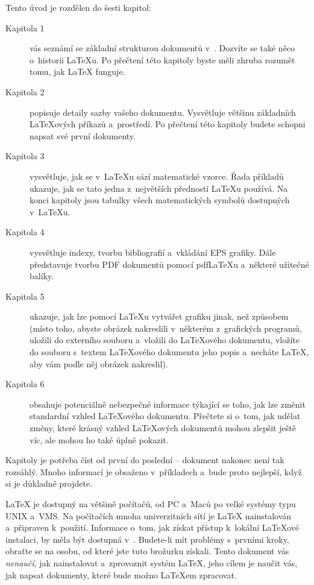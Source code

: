 \bigskip
\noindent Tento úvod je rozdělen do šesti kapitol:
\begin{description}
\item[Kapitola 1] vás seznámí se základní strukturou dokumentů v~\LaTeXe{}.
  Dozvíte se také něco o~historii \LaTeX u. Po přečtení této kapitoly
  byste měli zhruba rozumět tomu, jak \LaTeX{} funguje.
\item[Kapitola 2] popisuje detaily sazby vašeho dokumentu.
  Vysvětluje většinu základních \LaTeX ových příkazů a~prostředí.
  Po přečtení této kapitoly budete schopni napsat své první dokumenty.
\item[Kapitola 3] vysvětluje, jak se v~\LaTeX u sází matematické vzorce.
  Řada příkladů ukazuje, jak se tato jedna z~největších předností \LaTeX u
  používá. Na konci kapitoly jsou tabulky všech matematických symbolů
  dostupných v~\LaTeX u.
\item[Kapitola 4] vysvětluje indexy, tvorbu bibliografií a~vkládání EPS
  grafiky. Dále představuje tvorbu PDF dokumentů pomocí pdf\LaTeX u
  a~některé užitečné balíky.
\item[Kapitola 5] ukazuje, jak lze pomocí \LaTeX u vytvářet grafiku
   jinak, než  způsobem (místo toho, abyste obrázek nakreslili
   v~některém z~grafických programů, uložili do externího souboru a~vložili
   do \LaTeX ového dokumentu, vložíte do souboru s~textem \LaTeX ového dokumentu
   jeho popis a~necháte \LaTeX, aby vám podle něj obrázek nakreslil).
\item[Kapitola 6] obsahuje potenciálně nebezpečné informace týkající
  se toho, jak lze změnit standardní vzhled \LaTeX ového dokumentu.
  Přečtete si o~tom, jak udělat změny, které krásný vzhled \LaTeX ových
  dokumentů mohou zlepšit ještě víc, ale mohou ho také úplně pokazit.
\end{description}
\bigskip
\noindent Kapitoly je potřeba číst od první do poslední -- dokument
nakonec není tak rozsáhlý. Mnoho informací je obsaženo v~příkladech
a~bude proto nejlepší, když si je důkladně projdete.

\bigskip
\noindent \LaTeX{} je dostupný na většině počítačů, od PC a~Maců po
velké systémy typu UNIX a~VMS. Na počítačích mnoha univerzitních sítí
je \LaTeX{} nainstalován a~připraven k~použití. Informace o~tom, jak
získat přístup k~lokální \LaTeX ové instalaci, by měla být dostupná
v~\guide. Budete-li mít problémy s~prvními kroky, obraťte se
na osobu, od které jste tuto brožurku získali. Tento dokument vás
\emph{nenaučí}, jak nainstalovat a~zprovoznit systém \LaTeX, jeho
cílem je naučit vás, jak napsat dokumenty, které bude možno \LaTeX em
zpracovat.

